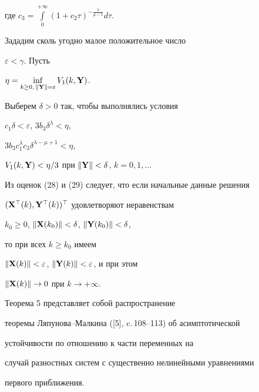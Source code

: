 \begin{pf}
где $c_3=\int\limits_{0}^{+\infty}(1+c_2 \tau


)^{-\frac\lambda{\mu-1}}d\tau$.





Зададим сколь угодно малое положительное число


$\varepsilon<\gamma$. Пусть


$\eta=\inf\limits_{k\geq 0, \, \|\bold Y\|=\varepsilon} V_1(k, \bold Y)$.


Выберем $\delta>0$ так, чтобы выполнялись условия


$c_1 \delta <\varepsilon$, $3b_3\delta^{\lambda} <\eta$,


$3b_3 c^\lambda_1 c_3\delta^{\lambda-\mu+1} <\eta$,


$V_1(k, \bold Y)<\eta/3$ при $\|\bold Y\|<\delta$, $k=0,1,\dotsc$





Из оценок (28) и (29) следует, что если начальные данные решения


$(\bold X^\top(k), \bold Y^\top(k))^\top$ удовлетворяют неравенствам


$k_0\geq 0$, $\|\bold X(k_0)\|< \delta$, $\|\bold Y(k_0)\|< \delta$,


то при всех $k\geq k_0$ имеем


$\|\bold X(k)\|< \varepsilon$, $\|\bold Y(k)\|< \varepsilon$, и при этом


$\|\bold X(k)\| \to 0$ при $k\to +\infty$.


\end{pf}





\begin{note}


Теорема 5 представляет собой распространение


теоремы Ляпунова--Малкина ([5], c.\,108--113) об асимптотической


устойчивости по отношению к части переменных на


случай разностных систем с существенно нелинейными уравнениями


первого приближения.


\end{note}





